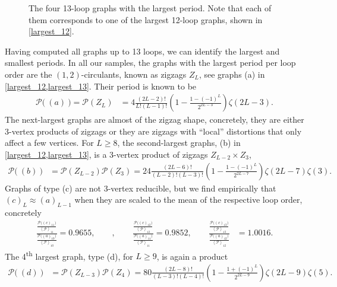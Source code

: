 \documentclass[12pt,a4paper]{article}
\newcommand{\period}{\mathcal P}
\renewcommand{\|}{\rule[-0.4ex]{0.2ex}{1.2em}}
\begin{document}
\begin{figure}[htb]
	\caption{The four 13-loop graphs with the largest period. Note that each of them corresponds   to one of the largest 12-loop graphs, shown in \cref{largest_12}.}
	\label{largest_13}
\end{figure}




Having computed all graphs up to 13 loops, we can identify the largest and smallest periods. 
In all our samples, the graphs with the largest period per loop order are the $(1,2)$-circulants, known as zigzags $Z_L$, see graphs (a) in \cref{largest_12,largest_13}. Their period is known to be \cite{broadhurst_knots_1995,brown_singlevalued_2015}
\begin{align}\label{zigzag_amplitude}
	\period \big( ~(a)~\big)=\period(Z_L) &= 4 \frac{(2L-2)!}{L! (L-1)!} \left( 1- \frac{1-(-1)^L}{2^{2L-3}} \right) \zeta(2L-3).
\end{align}
The next-largest graphs are almost of the zigzag shape, concretely, they are either 3-vertex products of zigzags or they are zigzags with \enquote{local} distortions that only affect a few vertices. For $L\geq 8$, the second-largest graphs, (b) in \cref{largest_12,largest_13}, is a 3-vertex product of   zigzags $Z_{L-2}\times Z_3$, 
\begin{align*}
	\period \big(  ~(b)~\big) &= \period(Z_{L-2}) \period(Z_3)=24 \frac{(2L-6)!}{(L-2)! (L-3)!} \left( 1- \frac{1-(-1)^L}{2^{2L-7}} \right) \zeta(2L-7) \zeta(3).
\end{align*}
Graphs of type (c) are not 3-vertex reducible, but we find empirically that $(c)_L \approx (a)_{L-1}$ when they are scaled to the mean of the respective loop order, concretely
\begin{align*}
	 \frac{\frac{\period \big( (c)_{11} \big)}{\left \langle \period \right \rangle _{11}}}{\frac{\period \big( (a)_{10} \big)}{\left \langle \period \right \rangle _{10}}}= 0.9655, \qquad , \qquad \frac{\frac{\period \big( (c)_{12} \big)}{\left \langle \period \right \rangle _{12}}}{\frac{\period \big( (a)_{11} \big) }{\left \langle \period \right \rangle _{11}}} = 0.9852, \qquad\frac{\frac{\period \big( (c)_{13} \big)}{\left \langle \period \right \rangle _{13}}}{\frac{\period \big( (a)_{12} \big)}{\left \langle \period \right \rangle _{12}}} &= 1.0016.
\end{align*} 
The 4\textsuperscript{th} largest graph, type (d), for $L\geq 9$, is again a product
\begin{align*}
	\period \big(  ~(d)~\big) &= \period(Z_{L-3}) \period(Z_4)=80 \frac{(2L-8)!}{(L-3)! (L-4)!} \left( 1- \frac{1+(-1)^L}{2^{2L-9}} \right) \zeta(2L-9) \zeta(5).
\end{align*}
\end{document}
